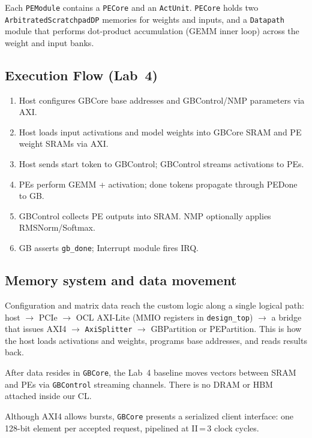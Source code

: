 \documentclass[11pt]{article}
\begin{document}
Each \texttt{PEModule} contains a \texttt{PECore} and an \texttt{ActUnit}.
\texttt{PECore} holds two \texttt{ArbitratedScratchpadDP} memories for weights
and inputs, and a \texttt{Datapath} module that performs dot-product
accumulation (GEMM inner loop) across the weight and input banks. 

\subsection{Execution Flow (Lab~4)}

\begin{enumerate}[nosep]
  \item Host configures GBCore base addresses and GBControl/NMP parameters
        via AXI.
  \item Host loads input activations and model weights into GBCore SRAM and
        PE weight SRAMs via AXI.
  \item Host sends start token to GBControl; GBControl streams activations
        to PEs.
  \item PEs perform GEMM + activation; done tokens propagate through
        PEDone to GB.
  \item GBControl collects PE outputs into SRAM. NMP optionally applies
        RMSNorm/Softmax.
  \item GB asserts \texttt{gb\_done}; Interrupt module fires IRQ.
\end{enumerate}


\subsection{Memory system and data movement}

Configuration and matrix data reach the custom logic along a single logical path: host $\rightarrow$ PCIe $\rightarrow$ OCL AXI-Lite
(MMIO registers in \texttt{design\_top}) $\rightarrow$ a bridge that issues AXI4 $\rightarrow$ \texttt{AxiSplitter} $\rightarrow$ GBPartition or PEPartition. This is how the host loads activations and weights, programs base addresses, and reads results back.

After data resides in \texttt{GBCore}, the Lab~4 baseline moves vectors between SRAM and PEs via \texttt{GBControl} streaming channels. There is no DRAM or HBM attached inside our CL.

Although AXI4 allows bursts, \texttt{GBCore} presents a serialized client interface: one 128-bit element per accepted request, pipelined at II\,=\,3 clock cycles. 
\end{document}
